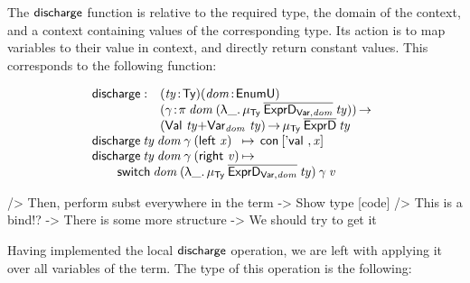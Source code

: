 The $\discharge$ function is relative to the required type, the domain
of the context, and a context containing values of the corresponding
type. Its action is to map variables to their value in context, and
directly return constant values. This corresponds to the following
function:

\[\stk{
\begin{array}{@{}ll}
\discharge : & \PITEL{\V{ty}}{\Ty}
               \PITEL{\V{dom}}{\EnumU} \\
             & \PI{\V{\gamma}}{\spi{\V{dom}}{(\LAM{\_} \IMu{\Ty}{\toIDesc{\HExprVarD{\V{dom}}}}{\V{ty}})}} \\
             & (\SUM{\Val{\V{ty}}}{\Var{\V{dom}}{\V{ty}}}) \To
               \IMu{\Ty}{\toIDesc{\HExprD}}{\V{ty}} 
\end{array} \\
\begin{array}{@{}l@{\:\mapsto\:\:}l}
\discharge\: \V{ty}\: \V{dom}\: \V{\gamma}\: (\SumLeft \V{x})  & \Con{\pair{\Eval{}}{\V{x}}{}} \\
\discharge\: \V{ty}\: \V{dom}\: \V{\gamma}\: (\SumRight \V{v}) &
\end{array}\\
\qquad\switch{\V{dom}}{(\LAM{\_}
\IMu{\Ty}{\toIDesc{\HExprVarD{\V{dom}}}}{\V{ty}})}{\V{\gamma}}{\V{v}}
}\]

\begin{wstructure}
            /> Then, perform subst everywhere in the term
                -> Show type [code]
                /> This is a bind!?
                -> There is some more structure 
                    -> We should try to get it
\end{wstructure}

Having implemented the local $\discharge$ operation, we are left with
applying it over all variables of the term. The type of this operation
is the following:

\newcommand{\substH}{\F{substExpr}}
\newcommand{\domNat}{dom_{\CN{nat}}}
\newcommand{\domBool}{dom_{\CN{bool}}}
\newcommand{\gammaNat}{\V{\ensuremath{\gamma_{\CN{nat}}}}}
\newcommand{\gammaBool}{\V{\ensuremath{\gamma_{\CN{bool}}}}}
\newcommand{\GammaSpi}[2]{\F{\ensuremath{\Gamma_{\CN{ty}}}}~#1~#2}

